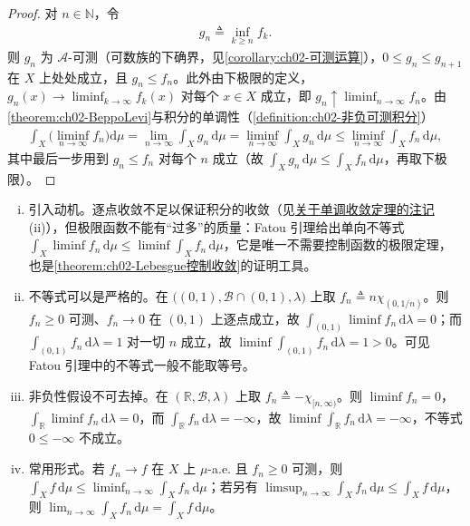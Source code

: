 \documentclass[../../main.tex]{subfiles}%
\begin{document}
\begin{proof}
对 $n\in\mathbb N$，令
\begin{align*}
g_n\triangleq\inf_{k\geqslant n}f_k.
\end{align*}
则 $g_n$ 为 $\mathscr A$-可测（可数族的下确界，见\cref{corollary:ch02-可测运算}），$0\leqslant g_n\leqslant g_{n+1}$ 在 $X$ 上处处成立，且 $g_n\leqslant f_n$。此外由下极限的定义，$g_n(x)\to\liminf_{k\to\infty}f_k(x)$ 对每个 $x\in X$ 成立，即 $g_n\uparrow\liminf_{n\to\infty}f_n$。由\cref{theorem:ch02-BeppoLevi}与积分的单调性（\cref{definition:ch02-非负可测积分}）
\begin{align*}
\int_X\Big(\liminf_{n\to\infty}f_n\Big)\mathrm{d}\mu
=\lim_{n\to\infty}\int_Xg_n\,\mathrm{d}\mu
=\liminf_{n\to\infty}\int_Xg_n\,\mathrm{d}\mu
\leqslant\liminf_{n\to\infty}\int_Xf_n\,\mathrm{d}\mu,
\end{align*}
其中最后一步用到 $g_n\leqslant f_n$ 对每个 $n$ 成立（故 $\int_Xg_n\,\mathrm{d}\mu\leqslant\int_Xf_n\,\mathrm{d}\mu$，再取下极限）。
\end{proof}

\begin{remark}\label{remark:ch02-Fatou动机}
\begin{enumerate}[(i)]
\item 引入动机。逐点收敛不足以保证积分的收敛（见\hyperref[remark:ch02-BeppoLevi动机]{关于单调收敛定理的注记}(ii)），但极限函数不能有“过多”的质量：Fatou 引理给出单向不等式 $\int_X\liminf f_n\,\mathrm{d}\mu\leqslant\liminf\int_Xf_n\,\mathrm{d}\mu$，它是唯一不需要控制函数的极限定理，也是\cref{theorem:ch02-Lebesgue控制收敛}的证明工具。
\item 不等式可以是严格的。在 $\big((0,1),\mathscr B\cap(0,1),\lambda\big)$ 上取 $f_n\triangleq n\chi_{(0,1/n)}$。则 $f_n\geqslant0$ 可测、$f_n\to0$ 在 $(0,1)$ 上逐点成立，故 $\int_{(0,1)}\liminf f_n\,\mathrm{d}\lambda=0$；而 $\int_{(0,1)}f_n\,\mathrm{d}\lambda=1$ 对一切 $n$ 成立，故 $\liminf\int_{(0,1)}f_n\,\mathrm{d}\lambda=1>0$。可见 Fatou 引理中的不等式一般不能取等号。
\item 非负性假设不可去掉。在 $(\mathbb R,\mathscr B,\lambda)$ 上取 $f_n\triangleq-\chi_{[n,\infty)}$。则 $\liminf f_n=0$，$\int_{\mathbb R}\liminf f_n\,\mathrm{d}\lambda=0$，而 $\int_{\mathbb R}f_n\,\mathrm{d}\lambda=-\infty$，故 $\liminf\int_{\mathbb R}f_n\,\mathrm{d}\lambda=-\infty$，不等式 $0\leqslant-\infty$ 不成立。
\item 常用形式。若 $f_n\to f$ 在 $X$ 上 $\mu$-a.e. 且 $f_n\geqslant0$ 可测，则 $\int_Xf\,\mathrm{d}\mu\leqslant\liminf_{n\to\infty}\int_Xf_n\,\mathrm{d}\mu$；若另有 $\limsup_{n\to\infty}\int_Xf_n\,\mathrm{d}\mu\leqslant\int_Xf\,\mathrm{d}\mu$，则 $\lim_{n\to\infty}\int_Xf_n\,\mathrm{d}\mu=\int_Xf\,\mathrm{d}\mu$。
\end{enumerate}
\end{remark}
\end{document}
